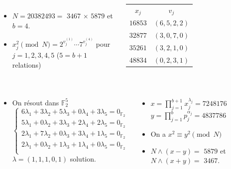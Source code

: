 \documentclass{beamer}
\begin{document}
\begin{frame}

\begin{block}{}
{\footnotesize
    \begin{columns}
        \begin{itemize}
        \item $N = 20382493 =$ \alert<6>{$3467$} $\times$ \alert<6>{$5879$} et $b = 4$.
        \item $x_j^2 \pmod N = 2^{v_j^{(1)}}\cdots 7^{v_j^{(4)}}$ pour $j = 1,2,3,4,5$ ($5 = b+1$ relations)
        \end{itemize}
        \begin{tabular}{cc}
                $x_j$ & $v_j$ \\
                $16853$ & $(6,5,2,2)$\\
                $32877$ & $(3,0,7,0)$\\
                $35261$ & $(3,2,1,0)$\\
                $48834$ & $(0,2,3,1)$\\
        \end{tabular}
        \end{columns}
}
\end{block}

{\small
\begin{columns}
\begin{itemize}[<+->]
    \item On résout dans $\mathbb F_2^5$
    \[
    \begin{cases}
    6\lambda_1 + 3\lambda_2 + 5\lambda_3 + 0\lambda_4 + 3\lambda_5 = 0_{\mathbb F_2} \\
    5\lambda_1 + 0\lambda_2 + 3\lambda_3 + 2\lambda_4 + 2\lambda_5 = 0_{\mathbb F_2} \\
    2\lambda_1 + 7\lambda_2 + 0\lambda_3 + 3\lambda_4 + 1\lambda_5 = 0_{\mathbb F_2} \\
    2\lambda_1 + 0\lambda_2 + 1\lambda_3 + 1\lambda_4 + 0\lambda_5 = 0_{\mathbb F_2} \\
    \end{cases}
    \]
    $\lambda = (1, 1, 1, 0, 1)$ solution.
\end{itemize}

\begin{itemize}[<+->]
    \item $x = \prod_{j=1}^{b+1}x_j^{\lambda_j} = 7248176$ \\ $y = \prod_{j=1}^b p_j^{\alpha_j} = 4837786$
    \item On a $x^2 \equiv y^2 \pmod N$
    \item $N \land (x-y) =$ \alert<6>{$5879$} et $N \land  (x+y) =$ \alert<6>{$3467$}.
\end{itemize}

\end{columns}
}
\end{frame}
\end{document}
